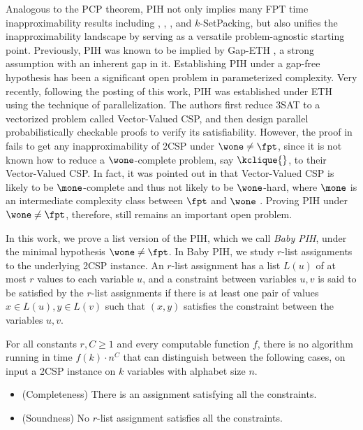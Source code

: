 Analogous to the PCP theorem, PIH not only implies many FPT time inapproximability results including \kclique{}, \ksetcover{}, \kexact{}, and {\sc $k$-SetPacking}, but also unifies the inapproximability landscape by serving as a versatile problem-agnostic starting point.  Previously, PIH was known to be implied by Gap-ETH \cite{DM18, CFM17}, a strong assumption with an inherent gap in it. Establishing PIH under a gap-free hypothesis has been a significant open problem in parameterized complexity. Very recently, following the posting of this work, PIH was established under ETH \cite{GLR+23} using the technique of parallelization. The authors first reduce 3SAT to a vectorized problem called Vector-Valued CSP, and then design parallel probabilistically checkable proofs to verify its satisfiability. However, the proof in \cite{GLR+23} fails to get any inapproximability of 2CSP under $\wone \neq \fpt$, since it is not known how to reduce a $\wone$-complete problem, say $\kclique{}$, to their Vector-Valued CSP. In fact, it was pointed out in \cite{GLR+23} that Vector-Valued CSP is likely to be $\mone$-complete and thus not likely to be $\wone$-hard, where $\mone$ is an intermediate complexity class between $\fpt$ and $\wone$ \cite{fellows2003blow, chen2007isomorphism}. Proving PIH under $\wone \neq \fpt$, therefore, still remains an important open problem.

In this work, we prove a list version of the PIH, which we call \emph{Baby PIH}, under the minimal hypothesis $\wone \neq \fpt$. In Baby PIH, we study $r$-list assignments to the underlying 2CSP instance. An $r$-list assignment has a list $L(u)$ of at most $r$ values to each variable $u$, and a constraint between variables $u,v$ is said to be satisfied by the $r$-list assignments if there is at least one pair of values $x \in L(u), y \in L(v)$ such that $(x,y)$ satisfies the constraint between the variables $u,v$. 

\begin{definition}
For all constants $r, C \ge 1$ and every computable function $f$, there is no algorithm running in time $f(k)\cdot n^C$ that can distinguish between the following cases, on input a 2CSP instance on $k$ variables with alphabet size $n$. 
    \begin{itemize}
        \item (Completeness) There is an assignment satisfying all the constraints. 
        \item (Soundness) No $r$-list assignment satisfies all the constraints. 
    \end{itemize}
\end{definition}

